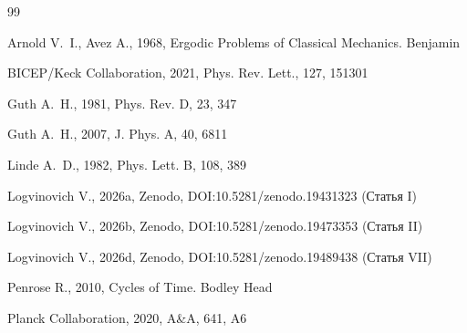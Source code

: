 \documentclass[12pt,a4paper]{article}
\begin{document}
\begin{thebibliography}{99}

Arnold V.~I., Avez A., 1968, Ergodic Problems of Classical Mechanics. Benjamin

BICEP/Keck Collaboration, 2021, Phys. Rev. Lett., 127, 151301

Guth A.~H., 1981, Phys. Rev. D, 23, 347

Guth A.~H., 2007, J. Phys. A, 40, 6811

Linde A.~D., 1982, Phys. Lett. B, 108, 389

Logvinovich V., 2026a, Zenodo, DOI:10.5281/zenodo.19431323 (Статья I)

Logvinovich V., 2026b, Zenodo, DOI:10.5281/zenodo.19473353 (Статья II)

Logvinovich V., 2026d, Zenodo, DOI:10.5281/zenodo.19489438 (Статья VII)

Penrose R., 2010, Cycles of Time. Bodley Head

Planck Collaboration, 2020, A\&A, 641, A6

\end{thebibliography}
\end{document}
